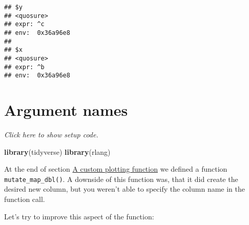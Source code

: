 \documentclass[]{book}
\newenvironment{Shaded}{\begin{snugshade}}{\end{snugshade}}
\newcommand{\ControlFlowTok}[1]{\textcolor[rgb]{0.13,0.29,0.53}{\textbf{#1}}}
\newcommand{\DecValTok}[1]{\textcolor[rgb]{0.00,0.00,0.81}{#1}}
\newcommand{\KeywordTok}[1]{\textcolor[rgb]{0.13,0.29,0.53}{\textbf{#1}}}
\newcommand{\NormalTok}[1]{#1}
\newcommand{\OperatorTok}[1]{\textcolor[rgb]{0.81,0.36,0.00}{\textbf{#1}}}
\newcommand{\StringTok}[1]{\textcolor[rgb]{0.31,0.60,0.02}{#1}}
\begin{document}
\begin{verbatim}
## $y
## <quosure>
## expr: ^c
## env:  0x36a96e8
## 
## $x
## <quosure>
## expr: ^b
## env:  0x36a96e8
\end{verbatim}

\hypertarget{argnames}{%
\section{Argument names}\label{argnames}}

\emph{Click here to show setup code.}

\begin{Shaded}
\begin{Highlighting}[]
\KeywordTok{library}\NormalTok{(tidyverse)}
\KeywordTok{library}\NormalTok{(rlang)}
\end{Highlighting}
\end{Shaded}

At the end of section \protect\hyperlink{colname}{A custom plotting function} we defined a function \texttt{mutate\_map\_dbl()}.
A downside of this function was, that it did create the desired new column, but you weren't able to specify the column name in the function call.

Let's try to improve this aspect of the function:

\begin{Shaded}
\end{Shaded}
\end{document}

